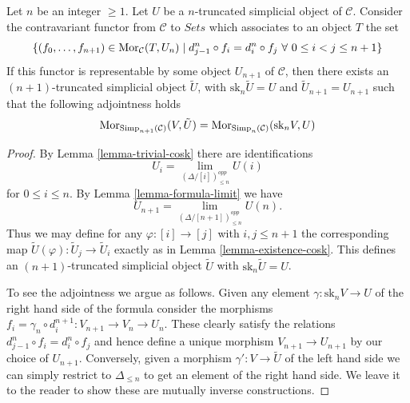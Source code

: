 \begin{lemma}
\label{lemma-work-out}
Let $n$ be an integer $\geq 1$. Let $U$ be a $n$-truncated
simplicial object of $\mathcal{C}$. Consider the
contravariant functor from $\mathcal{C}$ to $\textit{Sets}$
which associates to an object $T$ the set
$$
\{ (f_0, \ldots, f_{n + 1}) \in \mathop{\mathrm{Mor}}\nolimits_\mathcal{C}(T, U_n)
\mid
d^n_{j - 1} \circ f_i = d^n_i \circ f_j
\ \forall\ 0\leq i < j\leq n + 1\}
$$
If this functor is representable by some object $U_{n + 1}$
of $\mathcal{C}$, then there exists an $(n + 1)$-truncated
simplicial object $\tilde U$, with $\text{sk}_n \tilde U = U$
and $\tilde U_{n + 1} = U_{n + 1}$ such that the following
adjointness holds
$$
\mathop{\mathrm{Mor}}\nolimits_{\text{Simp}_{n + 1}(\mathcal{C})}(V, \tilde U)
=
\mathop{\mathrm{Mor}}\nolimits_{\text{Simp}_n(\mathcal{C})}(\text{sk}_nV, U)
$$
\end{lemma}

\begin{proof}
By Lemma \ref{lemma-trivial-cosk} there are identifications
$$
U_i = \lim_{(\Delta/[i])_{\leq n}^{opp}} U(i)
$$
for $0 \leq i \leq n$. By Lemma \ref{lemma-formula-limit}
we have
$$
U_{n + 1} = \lim_{(\Delta/[n + 1])_{\leq n}^{opp}} U(n).
$$
Thus we may define for any $\varphi : [i] \to [j]$
with $i, j \leq n + 1$ the corresponding map
$\tilde U(\varphi) : \tilde U_j \to \tilde U_i$ exactly as
in Lemma \ref{lemma-existence-cosk}. This defines
an $(n + 1)$-truncated simplicial object $\tilde U$
with $\text{sk}_n \tilde U = U$.

\medskip\noindent
To see the adjointness we argue as follows. Given any element
$\gamma : \text{sk}_n V \to U$ of the right hand side of the formula
consider the morphisms
$f_i = \gamma_n \circ d^{n + 1}_i : V_{n + 1} \to V_n \to U_n$.
These clearly satisfy the relations $d^n_{j - 1} \circ f_i = d^n_i \circ f_j$
and hence define a unique morphism $V_{n + 1} \to U_{n + 1}$
by our choice of $U_{n + 1}$.
Conversely, given a morphism $\gamma' : V \to \tilde U$
of the left hand side we can simply restrict to
$\Delta_{\leq n}$ to get an element of the right hand side.
We leave it to the reader to show these are mutually inverse
constructions.
\end{proof}

